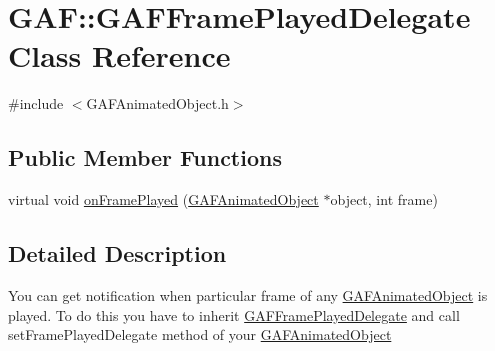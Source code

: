 \hypertarget{class_g_a_f_1_1_g_a_f_frame_played_delegate}{\section{G\-A\-F\-:\-:G\-A\-F\-Frame\-Played\-Delegate Class Reference}
\label{class_g_a_f_1_1_g_a_f_frame_played_delegate}
}


{\ttfamily \#include $<$G\-A\-F\-Animated\-Object.\-h$>$}

\subsection*{Public Member Functions}
\begin{DoxyCompactItemize}
\item 
virtual void \hyperlink{class_g_a_f_1_1_g_a_f_frame_played_delegate_a46541dc98536863db94393b5673284e4}{on\-Frame\-Played} (\hyperlink{class_g_a_f_1_1_g_a_f_animated_object}{G\-A\-F\-Animated\-Object} $\ast$object, int frame)
\end{DoxyCompactItemize}


\subsection{Detailed Description}
You can get notification when particular frame of any \hyperlink{class_g_a_f_1_1_g_a_f_animated_object}{G\-A\-F\-Animated\-Object} is played. To do this you have to inherit \hyperlink{class_g_a_f_1_1_g_a_f_frame_played_delegate}{G\-A\-F\-Frame\-Played\-Delegate} and call set\-Frame\-Played\-Delegate method of your \hyperlink{class_g_a_f_1_1_g_a_f_animated_object}{G\-A\-F\-Animated\-Object} 

